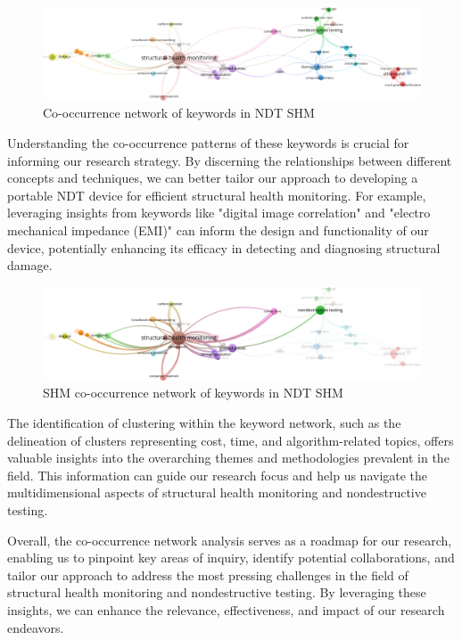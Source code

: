 \documentclass[journal, a4paper]{IEEEtran}
\begin{document}
\begin{figure}[h] %
  \centering
  \includegraphics[width=\textwidth]{./word_cloud/filtered/co_occurance_network.jpg}
  \caption{Co-occurrence network of keywords in NDT SHM}
  \label{fig:coOccuranceNetwork}
\end{figure}

Understanding the co-occurrence patterns of these keywords is crucial for informing our research strategy.
By discerning the relationships between different concepts and techniques, we can better tailor our approach
to developing a portable NDT device for efficient structural health monitoring.
For example, leveraging insights from keywords like "digital image correlation" and "electro mechanical impedance (EMI)"
can inform the design and functionality of our device, potentially enhancing its efficacy in detecting and diagnosing
structural damage.


\begin{figure}[h] %
  \centering
  \includegraphics[width=\textwidth]{./word_cloud/filtered/co_occurance_network_shm.jpg}
  \caption{SHM co-occurrence network of keywords in NDT SHM}
  \label{fig:coOccuranceNetworkSHM}
\end{figure}

The identification of clustering within the keyword network, such as the delineation of clusters representing cost,
time, and algorithm-related topics, offers valuable insights into the overarching themes and
methodologies prevalent in the field. This information can guide our research focus and help us navigate
the multidimensional aspects of structural health monitoring and nondestructive testing.

Overall, the co-occurrence network analysis serves as a roadmap for our research,
enabling us to pinpoint key areas of inquiry, identify potential collaborations,
and tailor our approach to address the most pressing challenges in the field of structural
health monitoring and nondestructive testing. By leveraging these insights, we can enhance the relevance,
effectiveness, and impact of our research endeavors.
\end{document}
